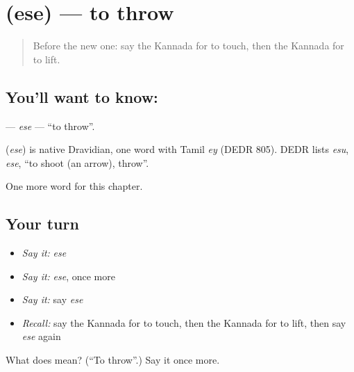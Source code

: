 \section[\texorpdfstring{\kn{ಎಸೆ} (ese)}{ಎಸೆ (ese)}]{ (ese) — to throw}

\label{lesson:KA-C235-ese}



\begin{quote}
Before the new one: say the Kannada for to touch, then the Kannada for to lift.
\end{quote}

\subsection*{You'll want to know: }
\textbf{} — \emph{ese} — \textquotedblleft{}to throw\textquotedblright{}.

\begin{cousinweb}
\textbf{} (\emph{ese}) is native Dravidian, one word with Tamil \emph{ey} (DEDR 805). DEDR lists \emph{esu}, \emph{ese}, \textquotedblleft{}to shoot (an arrow), throw\textquotedblright{}.
\end{cousinweb}

\begin{grammarlens}[title={What you've built}]
One more word for this chapter.
\end{grammarlens}

\subsection*{Your turn}
\begin{itemize}
\raggedright
  \item \emph{Say it:} \emph{ese}
  \item \emph{Say it:} \emph{ese}, once more
  \item \emph{Say it:} say \emph{ese}
  \item \emph{Recall:} say the Kannada for to touch, then the Kannada for to lift, then say \emph{ese} again
\end{itemize}

\begin{tcolorbox}[breakable,colback=teal!4,colframe=teal!35!black,title={Before you move on}]
What does  mean? (\textquotedblleft{}To throw\textquotedblright{}.) Say it once more.
\end{tcolorbox}
